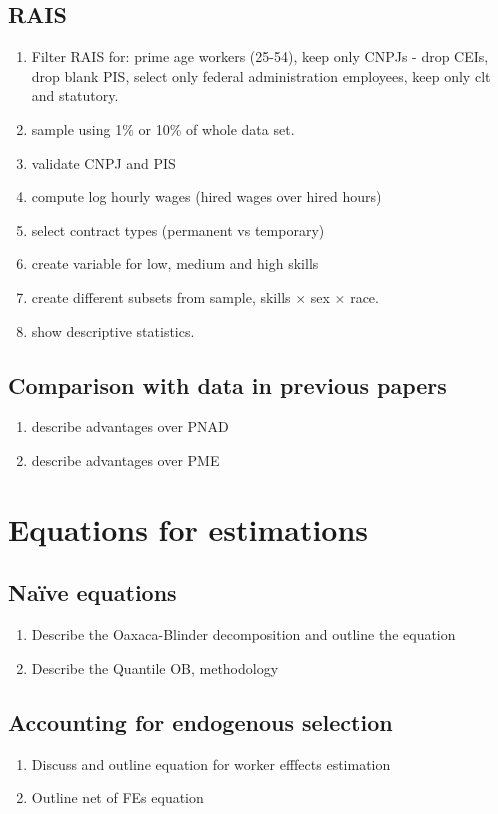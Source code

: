 \documentclass{article}
\begin{document}
\subsection{RAIS}
\begin{enumerate}
    \item Filter RAIS for: prime age workers (25-54), keep only CNPJs - drop CEIs, drop blank PIS, select only federal administration employees, keep only clt and statutory.
    \item sample using 1\% or 10\% of whole data set.  
    \item validate CNPJ and PIS
    \item compute log hourly wages (hired wages over hired hours)
    \item select contract types (permanent vs temporary)
    \item create variable for low, medium and high skills
    \item create different subsets from sample, skills $\times$ sex $\times$ race.
    \item show descriptive statistics.
\end{enumerate}

\subsection{Comparison with data in previous papers}
\begin{enumerate}
    \item describe advantages over PNAD
    \item describe advantages over PME
\end{enumerate}

\section{Equations for estimations}
\subsection{Naïve equations}
\begin{enumerate}
    \item Describe the Oaxaca-Blinder decomposition and outline the equation
    \item Describe the Quantile OB, methodology \cite{chernozhukov_inference_2013} 
\end{enumerate}
\subsection{Accounting for endogenous selection}
\begin{enumerate}
    \item Discuss \cite{canay_simple_2011} and outline equation for worker efffects estimation
    \item Outline net of FEs equation 
\end{enumerate}
\end{document}
